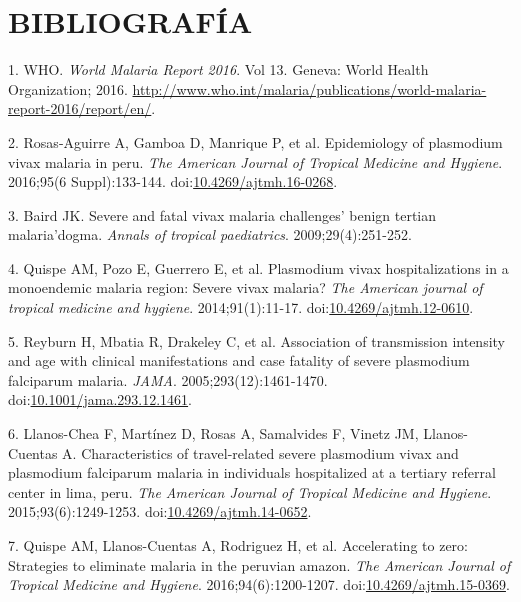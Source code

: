 \documentclass[]{article}
\begin{document}
\section{BIBLIOGRAFÍA}\label{bibliografia}

\hypertarget{refs}{}
\hypertarget{ref-WHO2016world}{}
1. WHO. \emph{World Malaria Report 2016}. Vol 13. Geneva: World Health
Organization; 2016.
\url{http://www.who.int/malaria/publications/world-malaria-report-2016/report/en/}.

\hypertarget{ref-rosas2016peru}{}
2. Rosas-Aguirre A, Gamboa D, Manrique P, et al. Epidemiology of
plasmodium vivax malaria in peru. \emph{The American Journal of Tropical
Medicine and Hygiene}. 2016;95(6 Suppl):133-144.
doi:\href{https://doi.org/10.4269/ajtmh.16-0268}{10.4269/ajtmh.16-0268}.

\hypertarget{ref-baird2009}{}
3. Baird JK. Severe and fatal vivax malaria challenges' benign tertian
malaria'dogma. \emph{Annals of tropical paediatrics}.
2009;29(4):251-252.

\hypertarget{ref-quispe2014}{}
4. Quispe AM, Pozo E, Guerrero E, et al. Plasmodium vivax
hospitalizations in a monoendemic malaria region: Severe vivax malaria?
\emph{The American journal of tropical medicine and hygiene}.
2014;91(1):11-17.
doi:\href{https://doi.org/10.4269/ajtmh.12-0610}{10.4269/ajtmh.12-0610}.

\hypertarget{ref-reyburn2015}{}
5. Reyburn H, Mbatia R, Drakeley C, et al. Association of transmission
intensity and age with clinical manifestations and case fatality of
severe plasmodium falciparum malaria. \emph{JAMA}.
2005;293(12):1461-1470.
doi:\href{https://doi.org/10.1001/jama.293.12.1461}{10.1001/jama.293.12.1461}.

\hypertarget{ref-llanoschea2015}{}
6. Llanos-Chea F, Martínez D, Rosas A, Samalvides F, Vinetz JM,
Llanos-Cuentas A. Characteristics of travel-related severe plasmodium
vivax and plasmodium falciparum malaria in individuals hospitalized at a
tertiary referral center in lima, peru. \emph{The American Journal of
Tropical Medicine and Hygiene}. 2015;93(6):1249-1253.
doi:\href{https://doi.org/10.4269/ajtmh.14-0652}{10.4269/ajtmh.14-0652}.

\hypertarget{ref-accelerate2016}{}
7. Quispe AM, Llanos-Cuentas A, Rodriguez H, et al. Accelerating to
zero: Strategies to eliminate malaria in the peruvian amazon. \emph{The
American Journal of Tropical Medicine and Hygiene}.
2016;94(6):1200-1207.
doi:\href{https://doi.org/10.4269/ajtmh.15-0369}{10.4269/ajtmh.15-0369}.
\end{document}
